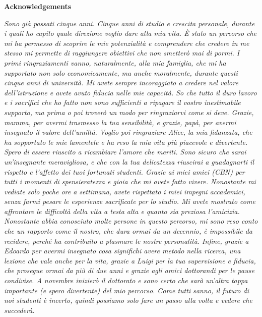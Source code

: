 \newpage
\thispagestyle{empty}

\begin{center}
  {\bf \Huge Acknowledgements}
\end{center}

\vspace{4cm}

\emph{
Sono già passati cinque anni. Cinque anni di studio e crescita personale, durante i quali ho capito quale direzione voglio dare alla mia vita. È stato un percorso che mi ha permesso di scoprire le mie potenzialità e comprendere che credere in me stesso mi permette di raggiungere obiettivi che non smetterò mai di pormi.
I primi ringraziamenti vanno, naturalmente, alla mia famiglia, che mi ha supportato non solo economicamente, ma anche moralmente, durante questi cinque anni di università. Mi avete sempre incoraggiato a credere nel valore dell'istruzione e avete avuto fiducia nelle mie capacità. So che tutto il duro lavoro e i sacrifici che ho fatto non sono sufficienti a ripagare il vostro inestimabile supporto, ma prima o poi troverò un modo per ringraziarvi come si deve. Grazie, mamma, per avermi trasmesso la tua sensibilità, e grazie, papà, per avermi insegnato il valore dell'umiltà.
Voglio poi ringraziare Alice, la mia fidanzata, che ha sopportato le mie lamentele e ha reso la mia vita più piacevole e divertente. Spero di essere riuscito a ricambiare l'amore che meriti. Sono sicuro che sarai un'insegnante meravigliosa, e che con la tua delicatezza riuscirai a guadagnarti il rispetto e l'affetto dei tuoi fortunati studenti.
Grazie ai miei amici (CBN) per tutti i momenti di spensieratezza e gioia che mi avete fatto vivere. Nonostante mi vediate solo poche ore a settimana, avete rispettato i miei impegni accademici, senza farmi pesare le esperienze sacrificate per lo studio. Mi avete mostrato come affrontare le difficoltà della vita a testa alta e quanto sia preziosa l'amicizia. Nonostante abbia conosciuto molte persone in questo percorso, mi sono reso conto che un rapporto come il nostro, che dura ormai da un decennio, è impossibile da recidere, perché ha contribuito a plasmare le nostre personalità.
Infine, grazie a Edoardo per avermi insegnato cosa significhi avere metodo nella ricerca, una lezione che vale anche per la vita, grazie a Luigi per la tua supervisione e fiducia, che prosegue ormai da più di due anni e grazie agli amici dottorandi per le pause condivise. A novembre inizierò il dottorato e sono certo che sarà un'altra tappa importante (e spero divertente) del mio percorso. Come tutti sanno, il futuro di noi studenti è incerto, quindi possiamo solo fare un passo alla volta e vedere che succederà.
}
